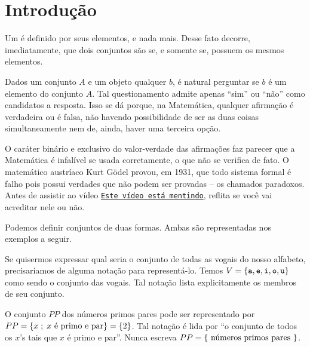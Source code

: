 \section{Introdução}
\label{sec:intro}

Um  é definido por seus elementos, e nada mais.
Desse fato decorre, imediatamente, que dois conjuntos são  se, e somente se, possuem os mesmos elementos.

Dados um conjunto $A$ e um objeto qualquer $b$, é natural perguntar se $b$ é um elemento do conjunto $A$.
Tal questionamento admite apenas ``sim'' ou ``não'' como candidatos a resposta.
Isso se dá porque, na Matemática, qualquer afirmação é verdadeira ou é falsa, não havendo possibilidade de ser as duas coisas simultaneamente nem de, ainda, haver uma terceira opção. 

O caráter binário e exclusivo do valor-verdade das afirmações faz parecer que a Matemática é infalível se usada corretamente, o que não se verifica de fato.
O matemático austríaco Kurt Gödel provou, em 1931, que todo sistema formal é falho pois possui verdades que não podem ser provadas -- os chamados paradoxos.
Antes de assistir ao vídeo \href{https://youtu.be/UI1xR_AECrU}{{\tt Este vídeo está mentindo}}, reflita se você vai acreditar nele ou não.

\begin{remark}
Podemos definir conjuntos de duas formas. Ambas são representadas nos exemplos a seguir.
\end{remark}

\begin{example}
\label{ex-vogais}
Se quisermos expressar qual seria o conjunto de todas as vogais do nosso alfabeto, precisaríamos de alguma notação para representá-lo. 
Temos $V=\left\{ \texttt{a}, \texttt{e}, \texttt{i}, \texttt{o}, \texttt{u}\right\}$ como sendo o conjunto das vogais. Tal notação lista explicitamente os membros de seu conjunto.
\end{example}

\begin{example}
\label{ex-primos-pares}
O conjunto $PP$ dos números primos pares pode ser representado por $PP = \left\{ x \;;\; x \text{ é primo e par}\right\} = \left\{ 2\right\}$.
Tal notação é lida por ``o conjunto de todos os $x$'s tais que $x$ é primo e par''.
Nunca escreva $PP = \left\{ \text{ números primos pares }\right\}$.
\end{example}

%
